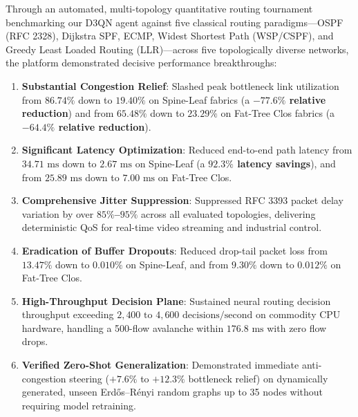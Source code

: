 Through an automated, multi-topology quantitative routing tournament benchmarking our D3QN agent against five classical routing paradigms---OSPF (RFC 2328), Dijkstra SPF, ECMP, Widest Shortest Path (WSP/CSPF), and Greedy Least Loaded Routing (LLR)---across five topologically diverse networks, the platform demonstrated decisive performance breakthroughs:
\begin{enumerate}
    \item \textbf{Substantial Congestion Relief}: Slashed peak bottleneck link utilization from $86.74\%$ down to \textbf{$19.40\%$} on Spine-Leaf fabrics (a \textbf{$-77.6\%$ relative reduction}) and from $65.48\%$ down to \textbf{$23.29\%$} on Fat-Tree Clos fabrics (a \textbf{$-64.4\%$ relative reduction}).
    \item \textbf{Significant Latency Optimization}: Reduced end-to-end path latency from $34.71\text{ ms}$ down to \textbf{$2.67\text{ ms}$} on Spine-Leaf (a \textbf{$92.3\%$ latency savings}), and from $25.89\text{ ms}$ down to \textbf{$7.00\text{ ms}$} on Fat-Tree Clos.
    \item \textbf{Comprehensive Jitter Suppression}: Suppressed RFC 3393 packet delay variation by over \textbf{$85\%$--$95\%$} across all evaluated topologies, delivering deterministic QoS for real-time video streaming and industrial control.
    \item \textbf{Eradication of Buffer Dropouts}: Reduced drop-tail packet loss from $13.47\%$ down to \textbf{$0.010\%$} on Spine-Leaf, and from $9.30\%$ down to \textbf{$0.012\%$} on Fat-Tree Clos.
    \item \textbf{High-Throughput Decision Plane}: Sustained neural routing decision throughput exceeding \textbf{$2,400\text{ to } 4,600\text{ decisions/second}$} on commodity CPU hardware, handling a 500-flow avalanche within $176.8\text{ ms}$ with zero flow drops.
    \item \textbf{Verified Zero-Shot Generalization}: Demonstrated immediate anti-congestion steering ($+7.6\%$ to $+12.3\%$ bottleneck relief) on dynamically generated, unseen Erd\H{o}s--R\'enyi random graphs up to 35 nodes without requiring model retraining.
\end{enumerate}

